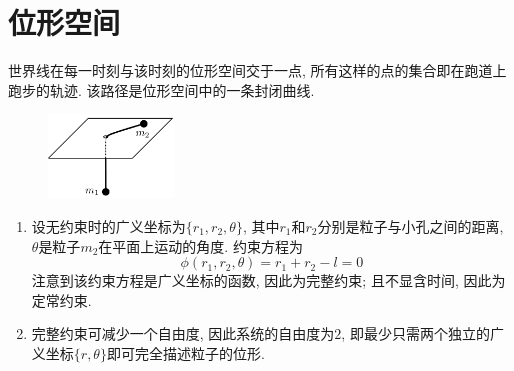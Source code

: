 \chapter{位形空间}
\begin{solution}
    世界线在每一时刻与该时刻的位形空间交于一点, 所有这样的点的集合即在跑道上跑步的轨迹. 该路径是位形空间中的一条封闭曲线.
\end{solution}

\begin{figure}[h]
    \centering
    \includegraphics[width=0.3\textwidth]{content/Figures/2-2}
    \caption{ }
    \label{fig:2-2}
\end{figure}
\begin{solution}
    \begin{enumerate}[label=(\arabic*)]
        \item 设无约束时的广义坐标为$\{r_1, r_2, \theta\}$, 其中$r_1$和$r_2$分别是粒子与小孔之间的距离, $\theta$是粒子$m_2$在平面上运动的角度.
        约束方程为\[
            \phi (r_1, r_2, \theta) = r_1 + r_2 - l = 0
        \]
        注意到该约束方程是广义坐标的函数, 因此为完整约束; 且不显含时间, 因此为定常约束.
        \item 完整约束可减少一个自由度, 因此系统的自由度为$2$, 即最少只需两个独立的广义坐标$\{r, \theta\}$即可完全描述粒子的位形.
    \end{enumerate}
\end{solution}

